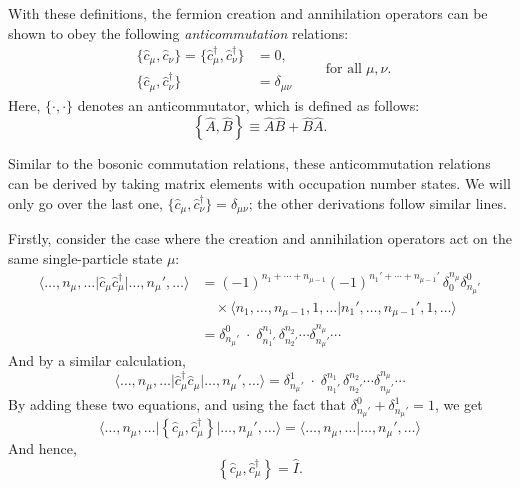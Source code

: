 \documentclass[pra,12pt]{revtex4}
\begin{document}
With these definitions, the fermion creation and annihilation
operators can be shown to obey the following \textit{anticommutation}
relations:
$$\boxed{\quad\begin{aligned}\,\big\{\hat{c}_\mu,\hat{c}_\nu\big\} = \big\{\hat{c}_\mu^\dagger,\hat{c}_\nu^\dagger\big\} &= 0, \\ \,\big\{\hat{c}_\mu,\hat{c}_\nu^\dagger\big\} &= \delta_{\mu\nu}\end{aligned}\qquad\textrm{for all}\;\mu,\nu.\quad}$$
Here, $\{\cdot,\cdot\}$ denotes an anticommutator, which is defined as
follows:
$$\left\{\hat{A},\hat{B}\right\} \equiv \hat{A}\hat{B} + \hat{B}\hat{A}.$$

Similar to the bosonic commutation relations, these anticommutation
relations can be derived by taking matrix elements with occupation
number states.  We will only go over the last one,
$\big\{\hat{c}_\mu,\hat{c}_\nu^\dagger\big\} = \delta_{\mu\nu}$; the
other derivations follow similar lines.

Firstly, consider the case where the creation and annihilation
operators act on the same single-particle state $\mu$:
$$\begin{aligned}\big\langle \dots,n_\mu,\dots \big| \hat{c}_\mu \hat{c}_\mu^\dagger \big|\dots, n_\mu', \dots\big\rangle &= (-1)^{n_1+\cdots+n_{\mu-1}} (-1)^{n_1'+\cdots+n_{\mu-1}'} \,\delta^{n_\mu}_0 \delta^0_{n_\mu'} \\ &\quad\times \big\langle n_1,\dots,n_{\mu-1}, 1, \dots\big| n_1',\dots,n_{\mu-1}', 1, \dots \big\rangle \\ &= \delta^0_{n_\mu'} \; \cdot \; \delta^{n_1}_{n_1'} \, \delta^{n_2}_{n_2'} \cdots \delta^{n_\mu}_{n_\mu'} \cdots\end{aligned}$$
And by a similar calculation,
$$\big\langle \dots,n_\mu,\dots \big| \hat{c}_\mu^\dagger \hat{c}_\mu \big|\dots, n_\mu', \dots\big\rangle = \delta^1_{n_\mu'} \; \cdot \; \delta^{n_1}_{n_1'} \, \delta^{n_2}_{n_2'} \cdots \delta^{n_\mu}_{n_\mu'} \cdots$$
By adding these two equations, and using the fact that
$\delta^0_{n_\mu'} + \delta^1_{n_\mu'} = 1$, we get
$$\big\langle \dots,n_\mu,\dots \big| \left\{ \hat{c}_\mu, \hat{c}_\mu^\dagger\right\} \big|\dots, n_\mu', \dots\big\rangle = \big\langle \dots,n_\mu,\dots \big|\dots, n_\mu', \dots\big\rangle$$
And hence,
$$\left\{ \hat{c}_\mu, \hat{c}_\mu^\dagger\right\} = \hat{I}.$$
\end{document}

